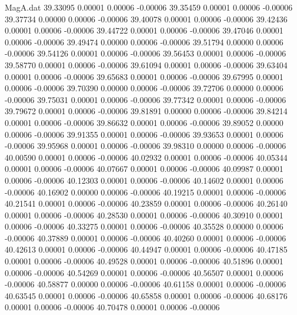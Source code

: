 \begin{filecontents}{MagA.dat}
  39.33095    0.00001    0.00006   -0.00006
  39.35459    0.00001    0.00006   -0.00006
  39.37734    0.00000    0.00006   -0.00006
  39.40078    0.00001    0.00006   -0.00006
  39.42436    0.00001    0.00006   -0.00006
  39.44722    0.00001    0.00006   -0.00006
  39.47046    0.00001    0.00006   -0.00006
  39.49474    0.00000    0.00006   -0.00006
  39.51794    0.00000    0.00006   -0.00006
  39.54126    0.00001    0.00006   -0.00006
  39.56453    0.00001    0.00006   -0.00006
  39.58770    0.00001    0.00006   -0.00006
  39.61094    0.00001    0.00006   -0.00006
  39.63404    0.00001    0.00006   -0.00006
  39.65683    0.00001    0.00006   -0.00006
  39.67995    0.00001    0.00006   -0.00006
  39.70390    0.00000    0.00006   -0.00006
  39.72706    0.00000    0.00006   -0.00006
  39.75031    0.00001    0.00006   -0.00006
  39.77342    0.00001    0.00006   -0.00006
  39.79672    0.00001    0.00006   -0.00006
  39.81891    0.00000    0.00006   -0.00006
  39.84214    0.00001    0.00006   -0.00006
  39.86632    0.00001    0.00006   -0.00006
  39.89052    0.00000    0.00006   -0.00006
  39.91355    0.00001    0.00006   -0.00006
  39.93653    0.00001    0.00006   -0.00006
  39.95968    0.00001    0.00006   -0.00006
  39.98310    0.00000    0.00006   -0.00006
  40.00590    0.00001    0.00006   -0.00006
  40.02932    0.00001    0.00006   -0.00006
  40.05344    0.00001    0.00006   -0.00006
  40.07667    0.00001    0.00006   -0.00006
  40.09987    0.00001    0.00006   -0.00006
  40.12303    0.00001    0.00006   -0.00006
  40.14602    0.00001    0.00006   -0.00006
  40.16902    0.00000    0.00006   -0.00006
  40.19215    0.00001    0.00006   -0.00006
  40.21541    0.00001    0.00006   -0.00006
  40.23859    0.00001    0.00006   -0.00006
  40.26140    0.00001    0.00006   -0.00006
  40.28530    0.00001    0.00006   -0.00006
  40.30910    0.00001    0.00006   -0.00006
  40.33275    0.00001    0.00006   -0.00006
  40.35528    0.00000    0.00006   -0.00006
  40.37889    0.00001    0.00006   -0.00006
  40.40260    0.00001    0.00006   -0.00006
  40.42613    0.00001    0.00006   -0.00006
  40.44947    0.00001    0.00006   -0.00006
  40.47185    0.00001    0.00006   -0.00006
  40.49528    0.00001    0.00006   -0.00006
  40.51896    0.00001    0.00006   -0.00006
  40.54269    0.00001    0.00006   -0.00006
  40.56507    0.00001    0.00006   -0.00006
  40.58877    0.00000    0.00006   -0.00006
  40.61158    0.00001    0.00006   -0.00006
  40.63545    0.00001    0.00006   -0.00006
  40.65858    0.00001    0.00006   -0.00006
  40.68176    0.00001    0.00006   -0.00006
  40.70478    0.00001    0.00006   -0.00006

\end{filecontents}
